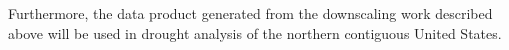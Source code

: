 Furthermore, the data product generated from the downscaling work described above will be used in drought analysis of the northern contiguous United States.
